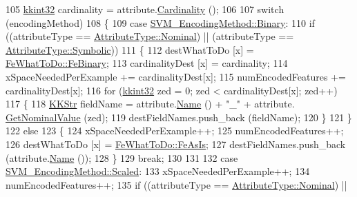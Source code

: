 \begin{DoxyCode}
105     \hyperlink{namespace_k_k_b_a8fa4952cc84fda1de4bec1fbdd8d5b1b}{kkint32}        cardinality   = attribute.\hyperlink{class_k_k_m_l_l_1_1_attribute_a7a7e8d04e3a93b47f6c2d1f99f0e42c6}{Cardinality} ();
106 
107     \textcolor{keywordflow}{switch} (encodingMethod)
108     \{
109       \textcolor{keywordflow}{case} \hyperlink{namespace_k_k_m_l_l_a1994af1d94ca5bf6e27f0cf803a8d64ca6ce976e8f061b2b5cfe4d0c50c3405dd}{SVM\_EncodingMethod::Binary}:
110         \textcolor{keywordflow}{if}  ((attributeType == \hyperlink{namespace_k_k_m_l_l_a99973706982b59debba670e2480555aba8c28d7c312116b8a46e2f466cb33d5b4}{AttributeType::Nominal})  ||  (attributeType == 
      \hyperlink{namespace_k_k_m_l_l_a99973706982b59debba670e2480555abaaddee1396a3e20ceea8071ed6da54866}{AttributeType::Symbolic}))
111         \{
112           destWhatToDo    [x] = \hyperlink{namespace_k_k_m_l_l_aa7a52865d78241e93b30731e46f99b43ab88633cd9a2d1569dc1979a5e5cb1752}{FeWhatToDo::FeBinary};
113           cardinalityDest [x] = cardinality;
114           xSpaceNeededPerExample += cardinalityDest[x];
115           numEncodedFeatures   += cardinalityDest[x];
116           \textcolor{keywordflow}{for}  (\hyperlink{namespace_k_k_b_a8fa4952cc84fda1de4bec1fbdd8d5b1b}{kkint32} zed = 0;  zed < cardinalityDest[x];  zed++)
117           \{
118             \hyperlink{class_k_k_b_1_1_k_k_str}{KKStr}  fieldName = attribute.\hyperlink{class_k_k_m_l_l_1_1_attribute_a3cd12e05138dfbda83c6802dc984e394}{Name} () + \textcolor{stringliteral}{"\_"} + attribute.
      \hyperlink{class_k_k_m_l_l_1_1_attribute_ad9342fb254fb972f63825f8d5be25311}{GetNominalValue} (zed);
119             destFieldNames.push\_back (fieldName);
120           \}
121         \}
122         \textcolor{keywordflow}{else}
123         \{
124           xSpaceNeededPerExample++;
125           numEncodedFeatures++;
126           destWhatToDo [x] = \hyperlink{namespace_k_k_m_l_l_aa7a52865d78241e93b30731e46f99b43a8fdde05abb9506fd4caa93ddc4490a13}{FeWhatToDo::FeAsIs};
127           destFieldNames.push\_back (attribute.\hyperlink{class_k_k_m_l_l_1_1_attribute_a3cd12e05138dfbda83c6802dc984e394}{Name} ());
128         \}
129         \textcolor{keywordflow}{break};
130 
131 
132       \textcolor{keywordflow}{case}  \hyperlink{namespace_k_k_m_l_l_a1994af1d94ca5bf6e27f0cf803a8d64ca7380ae6c5e1189eef50cfd0557d74e99}{SVM\_EncodingMethod::Scaled}:
133         xSpaceNeededPerExample++;
134         numEncodedFeatures++;
135         \textcolor{keywordflow}{if}  ((attributeType == \hyperlink{namespace_k_k_m_l_l_a99973706982b59debba670e2480555aba8c28d7c312116b8a46e2f466cb33d5b4}{AttributeType::Nominal})  ||

\end{DoxyCode}
